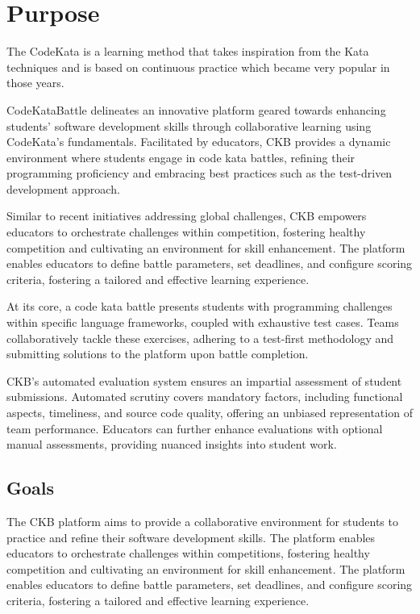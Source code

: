 \renewcommand{\arraystretch}{1.5} %

\section{Purpose}
\label{s:Purpose}%

The CodeKata is a learning method that takes inspiration from the Kata techniques and is based on continuous practice which became very popular in those years.

CodeKataBattle delineates an innovative platform geared towards enhancing students' software development skills through collaborative learning using CodeKata’s fundamentals. Facilitated by educators, CKB provides a dynamic environment where students engage in code kata battles, refining their programming proficiency and embracing best practices such as the test-driven development approach.

Similar to recent initiatives addressing global challenges, CKB empowers educators to orchestrate challenges within competition, fostering healthy competition and cultivating an environment for skill enhancement. The platform enables educators to define battle parameters, set deadlines, and configure scoring criteria, fostering a tailored and effective learning experience.

At its core, a code kata battle presents students with programming challenges within specific language frameworks, coupled with exhaustive test cases. Teams collaboratively tackle these exercises, adhering to a test-first methodology and submitting solutions to the platform upon battle completion.

CKB's automated evaluation system ensures an impartial assessment of student submissions. Automated scrutiny covers mandatory factors, including functional aspects, timeliness, and source code quality, offering an unbiased representation of team performance. Educators can further enhance evaluations with optional manual assessments, providing nuanced insights into student work.


\subsection{Goals}
\label{ss:goals}%
The CKB platform aims to provide a collaborative environment for students to practice and refine their software development skills. The platform enables educators to orchestrate challenges within competitions, fostering healthy competition and cultivating an environment for skill enhancement. The platform enables educators to define battle parameters, set deadlines, and configure scoring criteria, fostering a tailored and effective learning experience.

